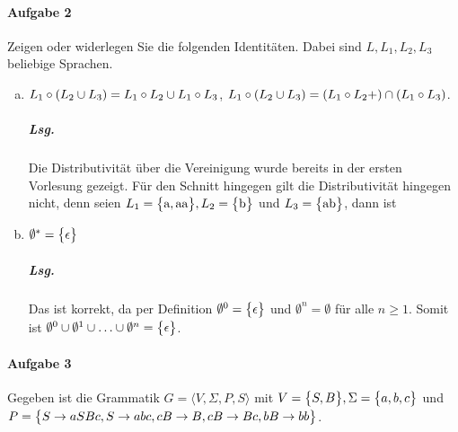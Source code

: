 \documentclass{scrreprt}
\begin{document}
\paragraph{Aufgabe 2}
Zeigen oder widerlegen Sie die folgenden Identitäten.
Dabei sind $L, L_1, L_2, L_3$ beliebige Sprachen.

\begin{enumerate}[(a)]
\item $L_1 \circ \qty(L_2 \cup L_3) = L_1 \circ L_2 \cup L_1 \circ L_3$,
  $L_1 \circ \qty(L_2 \cup L_3) = \qty(L_1 \circ L_2+) \cap \qty(L_1 \circ L_3)$.

  \subparagraph{Lsg.} Die Distributivität über die Vereinigung wurde bereits in
  der ersten Vorlesung gezeigt.
  Für den Schnitt hingegen gilt die Distributivität hingegen nicht, denn seien
  $L_1 = \qty\big{\text{a}, \text{aa}}, L_2 = \qty\big{\text{b}}$
  und $L_3 = \qty\big{\text{ab}}$, dann ist

\setcounter{enumi}{3}
\item $\emptyset^* = \qty\big{\epsilon}$

  \subparagraph{Lsg.} Das ist korrekt, da per Definition
  $\emptyset^0 = \qty\big{\epsilon}$ und $\emptyset^n = \emptyset$ für alle $n \ge 1$.
  Somit ist
  $\emptyset^0 \cup \emptyset^1 \cup \ldots \cup \emptyset^n = \qty\big{\epsilon}$.
\end{enumerate}

\paragraph{Aufgabe 3}
Gegeben ist die Grammatik $G = \langle V, \Sigma, P, S \rangle$
mit $V = \qty\big{S, B}, \Sigma = \qty\big{a, b, c}$ und
$P = \qty\big{S \to aSBc, S \to abc, cB \to B, cB \to Bc, bB \to bb}$.
\end{document}
